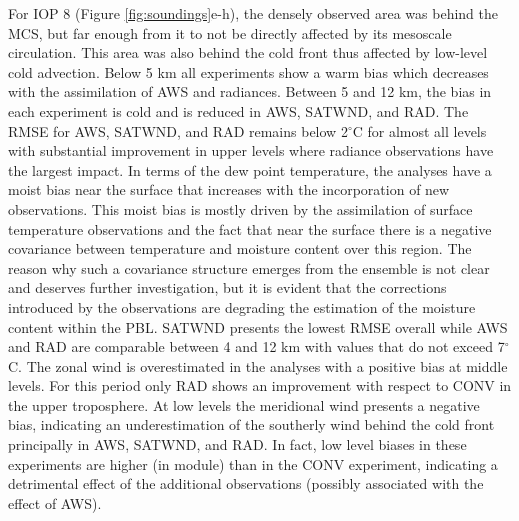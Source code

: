 \documentclass[final,5p,times,twocolumn,authoryear]{elsarticle} %
\begin{document}
For IOP 8 (Figure \ref{fig:soundings}e-h), the densely observed area was behind the MCS, but far enough from it to not be directly affected by its mesoscale circulation. This area was also behind the cold front thus affected by low-level cold advection. Below 5 km all experiments show a warm bias which decreases with the assimilation of AWS and radiances. Between 5 and 12 km, the bias in each experiment is cold and is reduced in AWS, SATWND, and RAD. The RMSE for AWS, SATWND, and RAD remains below 2\(^{\circ}\)C for almost all levels with substantial improvement in upper levels where radiance observations have the largest impact. In terms of the dew point temperature, the analyses have a moist bias near the surface that increases with the incorporation of new observations. This moist bias is mostly driven by the assimilation of surface temperature observations and the fact that near the surface there is a negative covariance between temperature and moisture content over this region. The reason why such a covariance structure emerges from the ensemble is not clear and deserves further investigation, but it is evident that the corrections introduced by the observations are degrading the estimation of the moisture content within the PBL. SATWND presents the lowest RMSE overall while AWS and RAD are comparable between 4 and 12 km with values that do not exceed 7\(^{\circ}\)C. The zonal wind is overestimated in the analyses with a positive bias at middle levels. For this period only RAD shows an improvement with respect to CONV in the upper troposphere. At low levels the meridional wind presents a negative bias, indicating an underestimation of the southerly wind behind the cold front principally in AWS, SATWND, and RAD. In fact, low level biases in these experiments are higher (in module) than in the CONV experiment, indicating a detrimental effect of the additional observations (possibly associated with the effect of AWS).
\end{document}
